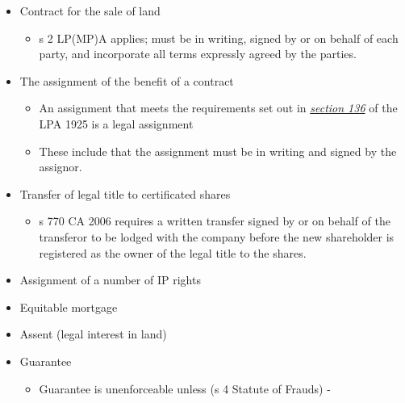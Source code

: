 \documentclass[
]{article}
\providecommand{\tightlist}{%
  \setlength{\itemsep}{0pt}\setlength{\parskip}{0pt}}
\begin{document}
\begin{itemize}
\tightlist
\item
  Contract for the sale of land

  \begin{itemize}
  \tightlist
  \item
    s 2 LP(MP)A applies; must be in writing, signed by or on behalf of
    each party, and incorporate all terms expressly agreed by the
    parties.
  \end{itemize}
\item
  The assignment of the benefit of a contract

  \begin{itemize}
  \tightlist
  \item
    An assignment that meets the requirements set out in
    \emph{\href{https://uk.practicallaw.thomsonreuters.com/2-505-5703?originationContext=document\&transitionType=PLDocumentLink\&contextData=(sc.Default)\&ppcid=0e69ecc7bd0b425c8c07be4517611bac}{section
    136}} of the LPA 1925 is a legal assignment
  \item
    These include that the assignment must be in writing and signed by
    the assignor.
  \end{itemize}
\item
  Transfer of legal title to certificated shares

  \begin{itemize}
  \tightlist
  \item
    s 770 CA 2006 requires a written transfer signed by or on behalf of
    the transferor to be lodged with the company before the new
    shareholder is registered as the owner of the legal title to the
    shares.
  \end{itemize}
\item
  Assignment of a number of IP rights
\item
  Equitable mortgage
\item
  Assent (legal interest in land)
\item
  Guarantee

  \begin{itemize}
  \tightlist
  \item
    Guarantee is unenforceable unless (s 4 Statute of Frauds) -


\end{itemize}
\end{itemize}
\end{document}
